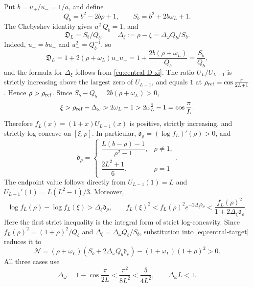 \documentclass[a4paper,preprint,12pt,nopreprintline,sort&compress]{elsarticle}
\numberwithin{equation}{section}
\theoremstyle{remark}
\begin{document}
Put \(b=u_+/u_-=1/a\), and define
\[
 Q_b=b^2-2b\rho+1,\qquad S_b=b^2+2b\omega_L+1.
\]
The Chebyshev identity gives \(u_-^2Q_b=1\), and
\begin{equation}\label{eq:central-D-QS}
 \mathfrak D_L=S_b/Q_b,\qquad
 \Delta_\xi:=\rho-\xi=\Delta_\omega Q_b/S_b.
\end{equation}
Indeed, \(u_+=bu_-\) and \(u_-^2=Q_b^{-1}\), so
\[
 \mathfrak D_L=1+2(\rho+\omega_L)u_-u_+
  =1+\frac{2b(\rho+\omega_L)}{Q_b}=\frac{S_b}{Q_b},
\]
and the formula for \(\Delta_\xi\) follows from
\eqref{eq:central-D-xi}.
The ratio \(U_L/U_{L-1}\) is strictly increasing above the largest zero
of \(U_{L-1}\), and equals \(1\) at
\(\rho_{\rm ref}=\cos\frac{\pi}{2L+1}\).  Hence
\(\rho>\rho_{\rm ref}\).  Since
\(S_b-Q_b=2b(\rho+\omega_L)>0\),
\[
 \xi>\rho_{\rm ref}-\Delta_\omega>2\omega_L-1
 >2\omega_L^2-1=\cos\frac{\pi}{L}.
\]
Therefore \(f_L(x)=(1+x)U_{L-1}(x)\) is positive, strictly increasing,
and strictly log-concave on \([\xi,\rho]\).  In particular,
\(\mathfrak d_\rho=(\log f_L)'(\rho)>0\), and
\[
 \mathfrak d_\rho=
 \begin{cases}
  \dfrac{L(b-\rho)-1}{\rho^2-1},&\rho\neq1,\\[6pt]
  \dfrac{2L^2+1}{6},&\rho=1
 \end{cases}.
\]
The endpoint value follows directly from \(U_{L-1}(1)=L\) and
\(U_{L-1}'(1)=L(L^2-1)/3\).  Moreover,
\[
 \log f_L(\rho)-\log f_L(\xi)>\Delta_\xi\mathfrak d_\rho,
 \qquad
 f_L(\xi)^2<f_L(\rho)^2e^{-2\Delta_\xi\mathfrak d_\rho}
 <\frac{f_L(\rho)^2}{1+2\Delta_\xi\mathfrak d_\rho}.
\]
Here the first strict inequality is the integral form of strict
log-concavity.  Since
\(f_L(\rho)^2=(1+\rho)^2/Q_b\) and
\(\Delta_\xi=\Delta_\omega Q_b/S_b\), substitution into
\eqref{eq:central-target} reduces it to
\begin{equation}\label{eq:N-positive-target}
 \mathcal N=(\rho+\omega_L)
 (S_b+2\Delta_\omega Q_b\mathfrak d_\rho)
 -(1+\omega_L)(1+\rho)^2>0.
\end{equation}
All three cases use
\begin{equation}\label{eq:Delta-omega-basic-bound}
 \Delta_\omega=1-\cos\frac{\pi}{2L}
 <\frac{\pi^2}{8L^2}<\frac5{4L^2},
 \qquad \Delta_\omega L<1.
\end{equation}
\end{document}
